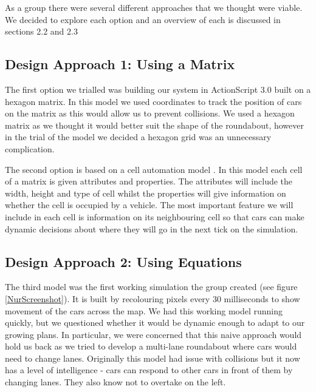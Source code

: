 \documentclass[11pt]{article}
\begin{document}
		\noindent As a group there were several different approaches that we thought were viable. 
		We decided to explore each option and an overview of each is discussed in sections 2.2 and 2.3

		
	\subsection{Design Approach 1: Using a Matrix}

	

	The first option we trialled was building our system in ActionScript 3.0 built on a hexagon matrix. 
	In this model we used coordinates to track the position of cars on the matrix as this would allow us to prevent collisions. 
	We used a hexagon matrix as we thought it would better suit the shape of the roundabout, however in the trial of the model we decided a hexagon grid was an unnecessary complication. 
	
	
	The second option is based on a cell automation model \cite{namekawa2005general}. 
	In this model each cell of a matrix is given attributes and properties. 
	The attributes will include the width, height and type of cell whilst the properties will give information on whether the cell is occupied by a vehicle. 
	The most important feature we will include in each cell is information on its neighbouring cell so that cars can make dynamic decisions about where they will go in the next tick on the simulation.
	
	
	\subsection{Design Approach 2: Using Equations}
	\FloatBarrier
	
	
    The third model was the first working simulation the group created (see figure \ref{NurScreenshot}). 
    It is built by recolouring pixels every 30 milliseconds to show movement of the cars across the map. 
    We had this working model running quickly, but we questioned whether it would be dynamic enough to adapt to our growing plans. 
    In particular, we were concerned that this naive approach would hold us back as we tried to develop a multi-lane roundabout where cars would need to change lanes. 
	Originally this model had issue with collisions but it now has a level of intelligence - cars can respond to other cars in front of them by changing lanes. 
    They also know not to overtake on the left. 	
\end{document}
